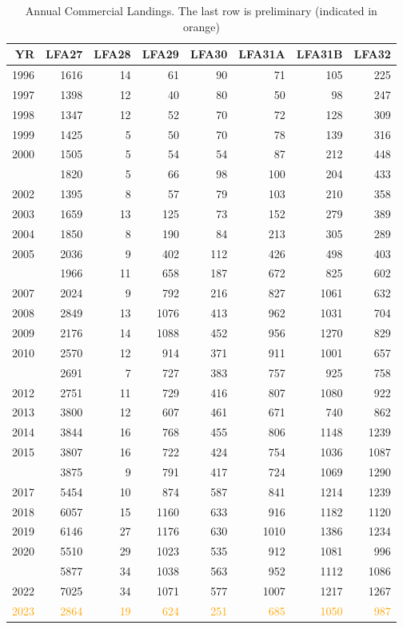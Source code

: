 \documentclass[
]{article}
\begin{document}
\begin{table}

\caption{\label{tab:unnamed-chunk-11}Annual Commercial Landings. The last row is preliminary (indicated in orange)}
\centering
\begin{tabular}[t]{rrrrrrrr}
\toprule
YR & LFA27 & LFA28 & LFA29 & LFA30 & LFA31A & LFA31B & LFA32\\
\midrule
1996 & 1616 & 14 & 61 & 90 & 71 & 105 & 225\\
1997 & 1398 & 12 & 40 & 80 & 50 & 98 & 247\\
1998 & 1347 & 12 & 52 & 70 & 72 & 128 & 309\\
1999 & 1425 & 5 & 50 & 70 & 78 & 139 & 316\\
2000 & 1505 & 5 & 54 & 54 & 87 & 212 & 448\\
\addlinespace
2001 & 1820 & 5 & 66 & 98 & 100 & 204 & 433\\
2002 & 1395 & 8 & 57 & 79 & 103 & 210 & 358\\
2003 & 1659 & 13 & 125 & 73 & 152 & 279 & 389\\
2004 & 1850 & 8 & 190 & 84 & 213 & 305 & 289\\
2005 & 2036 & 9 & 402 & 112 & 426 & 498 & 403\\
\addlinespace
2006 & 1966 & 11 & 658 & 187 & 672 & 825 & 602\\
2007 & 2024 & 9 & 792 & 216 & 827 & 1061 & 632\\
2008 & 2849 & 13 & 1076 & 413 & 962 & 1031 & 704\\
2009 & 2176 & 14 & 1088 & 452 & 956 & 1270 & 829\\
2010 & 2570 & 12 & 914 & 371 & 911 & 1001 & 657\\
\addlinespace
2011 & 2691 & 7 & 727 & 383 & 757 & 925 & 758\\
2012 & 2751 & 11 & 729 & 416 & 807 & 1080 & 922\\
2013 & 3800 & 12 & 607 & 461 & 671 & 740 & 862\\
2014 & 3844 & 16 & 768 & 455 & 806 & 1148 & 1239\\
2015 & 3807 & 16 & 722 & 424 & 754 & 1036 & 1087\\
\addlinespace
2016 & 3875 & 9 & 791 & 417 & 724 & 1069 & 1290\\
2017 & 5454 & 10 & 874 & 587 & 841 & 1214 & 1239\\
2018 & 6057 & 15 & 1160 & 633 & 916 & 1182 & 1120\\
2019 & 6146 & 27 & 1176 & 630 & 1010 & 1386 & 1234\\
2020 & 5510 & 29 & 1023 & 535 & 912 & 1081 & 996\\
\addlinespace
2021 & 5877 & 34 & 1038 & 563 & 952 & 1112 & 1086\\
2022 & 7025 & 34 & 1071 & 577 & 1007 & 1217 & 1267\\
\textcolor{orange}{2023} & \textcolor{orange}{2864} & \textcolor{orange}{19} & \textcolor{orange}{624} & \textcolor{orange}{251} & \textcolor{orange}{685} & \textcolor{orange}{1050} & \textcolor{orange}{987}\\
\bottomrule
\end{tabular}
\end{table}
\end{document}
